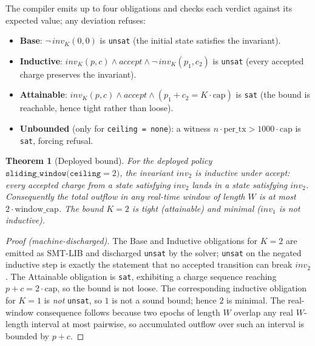 \documentclass[11pt]{article}
\theoremstyle{plain}
\newtheorem{theorem}{Theorem}
\theoremstyle{definition}
\theoremstyle{remark}
\begin{document}
\noindent The compiler emits up to four obligations and checks each verdict
against its expected value; any deviation refuses:
\begin{itemize}
\item \textbf{Base}: $\neg\,\textit{inv}_K(0,0)$ is \texttt{unsat} (the initial
  state satisfies the invariant).
\item \textbf{Inductive}: $\textit{inv}_K(p,c)\wedge \textit{accept}\wedge
  \neg\,\textit{inv}_K(p_1,c_2)$ is \texttt{unsat} (every accepted charge
  preserves the invariant).
\item \textbf{Attainable}: $\textit{inv}_K(p,c)\wedge \textit{accept}\wedge
  (p_1+c_2 = K\cdot\text{cap})$ is \texttt{sat} (the bound is reachable, hence
  tight rather than loose).
\item \textbf{Unbounded} (only for \texttt{ceiling = none}): a witness
  $n\cdot\text{per\_tx} > 1000\cdot\text{cap}$ is \texttt{sat}, forcing refusal.
\end{itemize}

\begin{theorem}[Deployed bound]\label{thm:bound}
For the deployed policy $\texttt{sliding\_window(ceiling}=2)$, the invariant
$\textit{inv}_2$ is inductive under \textit{accept}: every accepted charge from
a state satisfying $\textit{inv}_2$ lands in a state satisfying $\textit{inv}_2$.
Consequently the total outflow in any real-time window of length $W$ is at most
$2\cdot\text{window\_cap}$. The bound $K=2$ is \emph{tight} (attainable) and
\emph{minimal} ($\textit{inv}_1$ is not inductive).
\end{theorem}

\begin{proof}[Proof (machine-discharged)]
The Base and Inductive obligations for $K=2$ are emitted as SMT-LIB and
discharged \texttt{unsat} by the solver; \texttt{unsat} on the negated
inductive step is exactly the statement that no accepted transition can break
$\textit{inv}_2$. The Attainable obligation is \texttt{sat}, exhibiting a
charge sequence reaching $p+c = 2\cdot\text{cap}$, so the bound is not loose.
The corresponding inductive obligation for $K=1$ is \emph{not} \texttt{unsat},
so $1$ is not a sound bound; hence $2$ is minimal. The real-window consequence
follows because two epochs of length $W$ overlap any real $W$-length interval
at most pairwise, so accumulated outflow over such an interval is bounded by
$p+c$. \end{proof}
\end{document}
